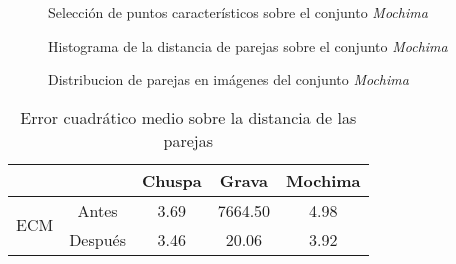 \begin{figure}[h]
	\centering     %
	\hspace{1mm}%
	
	\caption[Selección de puntos caracteristicos sobre el conjunto \textit{Mochima}]{Selección de puntos característicos sobre el conjunto \textit{Mochima}}
	\label{imagen:grid:0752-match}
\end{figure}

\begin{figure}[h]
	\centering     %
	\hspace{3mm}%
	
	\caption[Histograma de la distancia de parejas sobre el conjunto \textit{Mochima}]{Histograma de la distancia de parejas sobre el conjunto \textit{Mochima}}
	\label{imagen:grid:0752-hist}
\end{figure}

\begin{figure}[h]
	\centering     %
	\hspace{1mm}%
	
	\caption[Distribucion de parejas en imágenes del conjunto \textit{Mochima}]{Distribucion de parejas en imágenes del conjunto \textit{Mochima}}
	\label{imagen:grid:0752-align}
\end{figure}


\begin{table}[h]
	\centering
	\caption[Error cuadrático medio sobre la distancia de las parejas]{Error cuadrático medio sobre la distancia de las parejas}
	\label{tabla:ECM}
	\begin{tabular}{@{}lcccc@{}}
		\toprule
		\multicolumn{2}{l}{}           			 & Chuspa  & Grava & Mochima \\ \midrule
		\multirow{2}{*}{ECM} &\hfill Antes \hfill\vline& 3.69    &7664.50& 4.98    \\
							& Después      \vline& 3.46    & 20.06 & 3.92    \\
							
		\bottomrule 
	\end{tabular}
\end{table}

